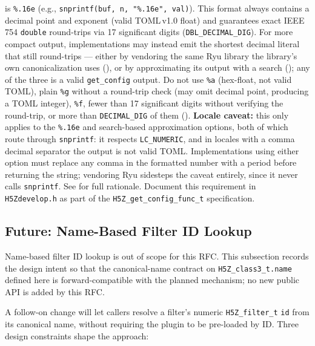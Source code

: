 \documentclass[../RFC-HDFG-2026-001.tex]{subfiles}
\begin{document}
\begin{itemize}
  is \texttt{\%.16e} (e.g., \texttt{snprintf(buf, n, "\%.16e", val)}).  This
  format always contains a decimal point and exponent (valid TOML\,v1.0
  float) and guarantees exact IEEE\,754 \texttt{double} round-trips via 17
  significant digits (\texttt{DBL\_DECIMAL\_DIG}).  For more compact output,
  implementations may instead emit the shortest decimal literal that still
  round-trips --- either by vendoring the same Ryu library the library's own
  canonicalization uses (), or by approximating
  its output with a search (); any of the
  three is a valid \texttt{get\_config} output.  Do not use \texttt{\%a}
  (hex-float, not valid TOML), plain \texttt{\%g} without a round-trip check
  (may omit decimal point, producing a TOML integer), \texttt{\%f}, fewer
  than 17 significant digits without verifying the round-trip, or more than
  \texttt{DECIMAL\_DIG} of them ().
  \textbf{Locale caveat:} this only applies to the \texttt{\%.16e} and
  search-based approximation options, both of which route through
  \texttt{snprintf}: it respects \texttt{LC\_NUMERIC}, and in locales with a
  comma decimal separator the output is not valid TOML.  Implementations
  using either option must replace any comma in the formatted number with a
  period before returning the string; vendoring Ryu sidesteps the caveat
  entirely, since it never calls \texttt{snprintf}.
  See  for full rationale.
  Document this requirement in \texttt{H5Zdevelop.h} as part of the
  \texttt{H5Z\_get\_config\_func\_t} specification.
\end{itemize}


\subsection{Future: Name-Based Filter ID Lookup}
\label{sec:future-name-lookup}

\begin{outofscope}
Name-based filter ID lookup is out of scope for this RFC.  This
subsection records the design intent so that the canonical-name
contract on \texttt{H5Z\_class3\_t.name} defined here is
forward-compatible with the planned mechanism; no new public API is
added by this RFC.
\end{outofscope}

A follow-on change will let callers resolve a filter's numeric
\texttt{H5Z\_filter\_t} \texttt{id} from its canonical name, without
requiring the plugin to be pre-loaded by ID.  Three design constraints
shape the approach:
\end{document}
